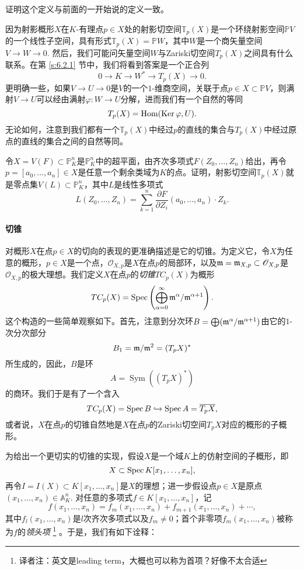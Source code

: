 \begin{exe}\label{exe:3.27}
	证明这个定义与前面的一开始说的\naive 定义一致。
\end{exe}

因为射影概形$X$在$K$-有理点$p\in X$处的射影切空间$\mathbb T_p(X)$是一个环绕射影空间$\mathbb PV$的一个线性子空间，具有形式$\mathbb T_p(X)=\mathbb PW$，其中$W$是一个商矢量空间$V\to W\to 0$. 然后，我们可能问矢量空间$W$与Zariski切空间$T_p(X)$之间具有什么联系。在第 \ref{s:6.2.1} 节中，我们将看到答案是一个正合列
\[
	0\longrightarrow K\longrightarrow W^* \longrightarrow T_p(X)\longrightarrow 0.
\]
更明确一些，如果$V\to U\to 0$是$V$的一个$1$-维商空间，关联于点$p\in X\subset \mathbb PV$，则满射$V\to U$可以经由满射$\varphi:W\to U$分解，进而我们有一个自然的等同
\[
	T_p(X)=\operatorname{Hom}(\operatorname{Ker}\varphi,U).
\]
无论如何，注意到我们都有一个$\mathbb T_p(X)$中经过$p$的直线的集合与$T_p(X)$中经过原点的直线的集合之间的自然等同。

\begin{exe}\label{exe:3.28}
	令$X=V(F)\subset \mathbb P_K^n$是$\mathbb P_K^n$中的超平面，由齐次多项式$F(Z_0,\dots,Z_n)$给出，再令$p=[a_0,\dots,a_n]\in X$是任意一个剩余类域为$K$的点。证明，射影切空间$\mathbb T_p(X)$就是零点集$V(L)\subset \mathbb P_K^n$，其中$L$是线性多项式
	\[
		L(Z_0,\dots,Z_n)=\sum_{k=1}^n\frac{\partial F}{\partial Z_i}(a_0,\dots,a_n)\cdot Z_k.
	\]
\end{exe}

\paragraph*{切锥}
对概形$X$在点$p\in X$的切向的表现的更准确描述是它的切锥。为定义它，令$X$为任意的概形，$p\in X$是一个点，$\mathscr O_{X,p}$是$X$在点$p$的局部环，以及$\mathfrak{m}=\mathfrak{m}_{X,p}\subset \mathscr O_{X,p}$是$\mathscr O_{X,p}$的极大理想。我们定义$X$在点$p$的\textit{切锥}$TC_p(X)$为概形
\[
	TC_p(X)=\operatorname{Spec} \left(\bigoplus_{\alpha=0}^\infty \mathfrak{m}^\alpha/\mathfrak{m}^{\alpha+1}\right).
\]
这个构造的一些简单观察如下。首先，注意到分次环$B=\bigoplus (\mathfrak{m}^\alpha/\mathfrak{m}^{\alpha+1})$由它的$1$-次分次部分
\[
	B_1=\mathfrak{m}/\mathfrak{m}^2=(T_pX)^*
\]
所生成的，因此，$B$是环
\[
	A=\operatorname{Sym}((T_pX)^*)
\]
的商环。我们于是有了一个含入
\[
	TC_p(X)=\operatorname{Spec} B\hookrightarrow \operatorname{Spec} A=\overline{T_pX},
\]
或者说，$X$在点$p$的切锥自然地是$X$在点$p$的Zariski切空间$T_pX$对应的概形的子概形。

为给出一个更切实的切锥的实现，假设$X$是一个域$K$上的仿射空间的子概形，即
\[
	X\subset \operatorname{Spec} K[x_1,\dots,x_n],
\]
再令$I=I(X)\subset K[x_1,\dots,x_n]$是$X$的理想；进一步假设点$p\in X$是原点$(x_1,\dots,x_n)\in \mathbb A_K^n$. 对任意的多项式$f\in K[x_1,\dots,x_n]$，记
\[
	f(x_1,\dots,x_n)=f_m(x_1,\dots,x_n)+f_{m+1}(x_1,\dots,x_n)+\cdots,
\]
其中$f_l(x_1,\dots,x_n)$是$l$次齐次多项式以及$f_m\neq 0$；首个非零项$f_m(x_1,\dots,x_n)$被称为$f$的\textit{领头项}%
\footnote{译者注：英文是leading term，大概也可以称为首项？好像不太合适}%
。于是，我们有如下诠释：

